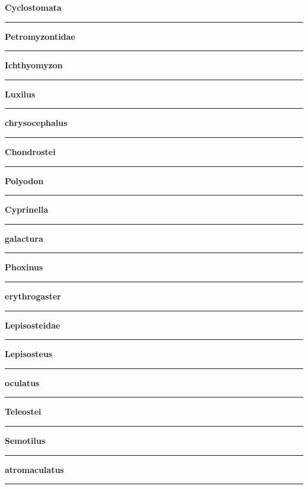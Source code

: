 \documentclass[11pt]{exam}
\newcommand*\Matching[1]{
\ifprintanswers
	\textbf{#1}
\else
	\rule{2.1in}{0.4pt}
\fi
}
\newlength\matchlena
\newlength\matchlenb
\newcommand\MatchQuestion[2]{%
	\setlength\matchlenb{\linewidth}
	\addtolength\matchlenb{-\matchlena}
	\parbox[t]{\matchlena}{\Matching{#1}}\enspace\parbox[t]{\matchlenb}{#2}}
\begin{document}
\begin{questions}
\begin{multicols}{2}
\question\MatchQuestion{Cyclostomata}{}
\vspace{1.5\baselineskip}

\question\MatchQuestion{Petromyzontidae}{}
\vspace{1.5\baselineskip}

\question\MatchQuestion{Ichthyomyzon}{}
\vspace{1.5\baselineskip}

\question\MatchQuestion{Luxilus}{}
\vspace{1.5\baselineskip}

\question\MatchQuestion{chrysocephalus}{}
\vspace{1.5\baselineskip}

\question\MatchQuestion{Chondrostei}{}
\vspace{1.5\baselineskip}

\question\MatchQuestion{Polyodon}{}
\vspace{1.5\baselineskip}

\question\MatchQuestion{Cyprinella}{}
\vspace{1.5\baselineskip}

\question\MatchQuestion{galactura}{}
\vspace{1.5\baselineskip}

\question\MatchQuestion{Phoxinus}{}
\vspace{1.5\baselineskip}

\question\MatchQuestion{erythrogaster}{}
\vspace{1.5\baselineskip}

\question\MatchQuestion{Lepisosteidae}{}
\vspace{1.5\baselineskip}

\question\MatchQuestion{Lepisosteus}{}
\vspace{1.5\baselineskip}

\question\MatchQuestion{oculatus}{}
\vspace{1.5\baselineskip}
\end{multicols}
\newpage

\begin{multicols}{2}
\question\MatchQuestion{Teleostei}{}
\vspace{1.5\baselineskip}

\question\MatchQuestion{Semotilus}{}
\vspace{1.5\baselineskip}

\question\MatchQuestion{atromaculatus}{}
\vspace{1.5\baselineskip}


\end{multicols}
\end{questions}
\end{document}
